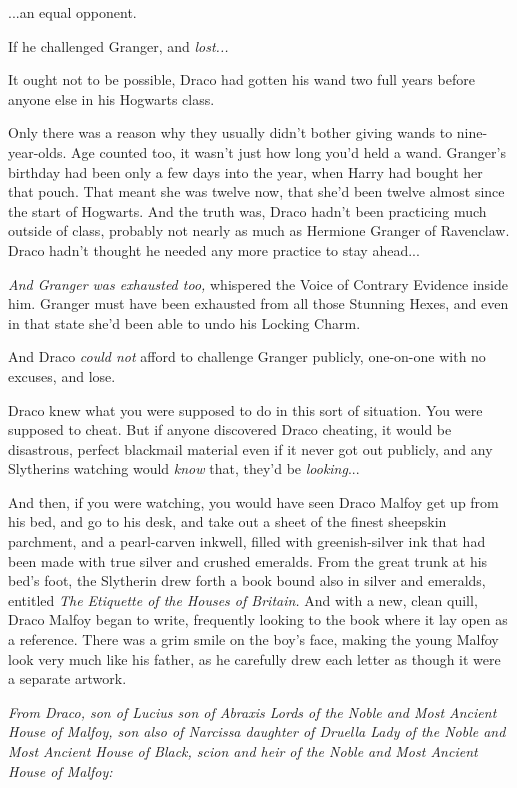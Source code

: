 ...an equal opponent.

If he challenged Granger, and \emph{lost...}

It ought not to be possible, Draco had gotten his wand two full years before anyone else in his Hogwarts class.

Only there was a reason why they usually didn't bother giving wands to nine-year-olds. Age counted too, it wasn't just how long you'd held a wand. Granger's birthday had been only a few days into the year, when Harry had bought her that pouch. That meant she was twelve now, that she'd been twelve almost since the start of Hogwarts. And the truth was, Draco hadn't been practicing much outside of class, probably not nearly as much as Hermione Granger of Ravenclaw. Draco hadn't thought he needed any more practice to stay ahead...

\emph{And Granger was exhausted too,} whispered the Voice of Contrary Evidence inside him. Granger must have been exhausted from all those Stunning Hexes, and even in that state she'd been able to undo his Locking Charm.

And Draco \emph{could not} afford to challenge Granger publicly, one-on-one with no excuses, and lose.

Draco knew what you were supposed to do in this sort of situation. You were supposed to cheat. But if anyone discovered Draco cheating, it would be disastrous, perfect blackmail material even if it never got out publicly, and any Slytherins watching would \emph{know} that, they'd be \emph{looking}...

And then, if you were watching, you would have seen Draco Malfoy get up from his bed, and go to his desk, and take out a sheet of the finest sheepskin parchment, and a pearl-carven inkwell, filled with greenish-silver ink that had been made with true silver and crushed emeralds. From the great trunk at his bed's foot, the Slytherin drew forth a book bound also in silver and emeralds, entitled \emph{The Etiquette of the Houses of Britain.} And with a new, clean quill, Draco Malfoy began to write, frequently looking to the book where it lay open as a reference. There was a grim smile on the boy's face, making the young Malfoy look very much like his father, as he carefully drew each letter as though it were a separate artwork.

\emph{From Draco, son of Lucius son of Abraxis Lords of the Noble and Most Ancient House of Malfoy, son also of Narcissa daughter of Druella Lady of the Noble and Most Ancient House of Black, scion and heir of the Noble and Most Ancient House of Malfoy:}


